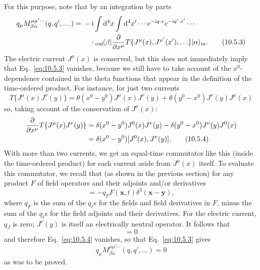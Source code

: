 For this purpose, note that by an integration by parts
\begin{align}
  q_\mu M^{\mu\mu'\cdots}_{\beta\alpha}(q,q',\ldots)
  ={}&-\mathrm{i}\int \mathop{}\!\mathrm{d}^4x\int \mathop{}\!\mathrm{d}^4x'\cdots
  e^{-\mathrm{i} q\cdot x}e^{-\mathrm{i} q'\cdot x'}\cdots \notag\\
  &\quad\cdot
  {}_{\mathrm{out}}\!\langle \beta\rvert
  \frac{\partial}{\partial x^\mu}
  T\{J^\mu(x),J^{\mu'}(x'),\ldots\}
  \lvert \alpha\rangle_{\mathrm{in}}.
  \tag{10.5.3}\label{eq:10.5.3}
\end{align}
The electric current $J^\mu(x)$ is conserved, but this does not immediately
imply that Eq.~\eqref{eq:10.5.3} vanishes, because we still have to take
account of the $x^0$-dependence contained in the theta functions that appear
in the definition of the time-ordered product. For instance, for just two
currents
\begin{equation*}
  T\{J^\mu(x)J^\nu(y)\}
  =\theta(x^0-y^0)J^\mu(x)J^\nu(y)
  +\theta(y^0-x^0)J^\nu(y)J^\mu(x)
\end{equation*}
so, taking account of the conservation of $J^\mu(x)$:
\begin{align}
  \frac{\partial}{\partial x^\mu}T\{J^\mu(x)J^\nu(y)\}
  ={}&\delta(x^0-y^0)J^0(x)J^\nu(y)
  -\delta(y^0-x^0)J^\nu(y)J^0(x) \notag\\
  ={}&\delta(x^0-y^0)[J^0(x),J^\nu(y)].
  \tag{10.5.4}\label{eq:10.5.4}
\end{align}
With more than two currents, we get an equal-time commutator like this
(inside the time-ordered product) for each current aside from $J^\mu(x)$
itself. To evaluate this commutator, we recall that (as shown in the previous
section) for any product $F$ of field operators and their adjoints and/or
derivatives
\begin{equation*}
  [J^0(\mathbf{x},t),F(\mathbf{y},t)]
  =-q_F F(\mathbf{x},t)\delta^3(\mathbf{x}-\mathbf{y}),
\end{equation*}
where $q_F$ is the sum of the $q_\ell$s for the fields and field derivatives
in $F$, minus the sum of the $q_\ell$s for the field adjoints and their
derivatives. For the electric current, $q_J$ is zero; $J^\nu(y)$ is itself an
electrically neutral operator. It follows that
\begin{equation}
  [J^0(\mathbf{x},t),J^\nu(\mathbf{y},t)]=0
  \tag{10.5.5}\label{eq:10.5.5}
\end{equation}
and therefore Eq.~\eqref{eq:10.5.4} vanishes, so that
Eq.~\eqref{eq:10.5.3} gives
\begin{equation}
  q_\mu M^{\mu\mu'\cdots}_{\beta\alpha}(q,q',\ldots)=0
  \tag{10.5.6}\label{eq:10.5.6}
\end{equation}
as was to be proved.

